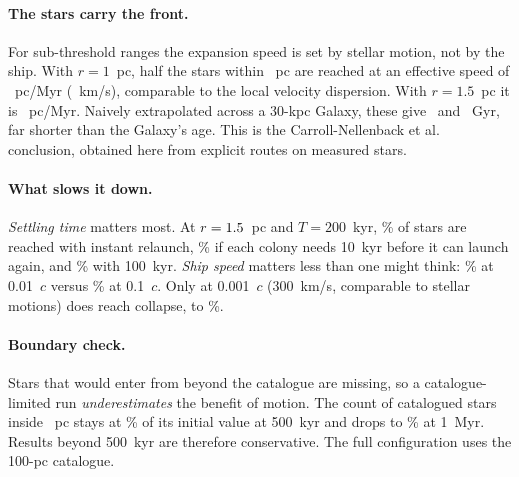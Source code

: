 \paragraph{The stars carry the front.} For sub-threshold ranges the expansion
speed is set by stellar motion, not by the ship. With $r=1$~pc, half the stars
within \TdEval~pc are reached at an effective speed of \FrontOne~pc/Myr
(\FrontOneKms~km/s), comparable to the local velocity dispersion. With
$r=1.5$~pc it is \FrontOneHalf~pc/Myr. Naively extrapolated across a
30-kpc Galaxy, these give \GalaxyCrossGyrOne\ and \GalaxyCrossGyrOneHalf~Gyr,
far shorter than the Galaxy's age. This is the Carroll-Nellenback et al.\
\cite{carroll2019fermi} conclusion, obtained here from explicit routes on
measured stars.

\paragraph{What slows it down.} \emph{Settling time} matters most. At
$r=1.5$~pc and $T=200$~kyr, \SettleZero\% of stars are reached with
instant relaunch, \SettleTen\% if each colony needs 10~kyr before it can
launch again, and \SettleHundred\% with 100~kyr. \emph{Ship speed} matters less
than one might think: \SpeedMid\% at 0.01~$c$ versus \SpeedFast\% at 0.1~$c$.
Only at 0.001~$c$ (300~km/s, comparable to stellar motions) does reach
collapse, to \SpeedSlow\%.

\paragraph{Boundary check.} Stars that would enter from beyond the catalogue
are missing, so a catalogue-limited run \emph{underestimates} the benefit of
motion. The count of catalogued stars inside \TdEval~pc stays at
\RetFiveHundred\% of its initial value at 500~kyr and drops to \RetThousand\% at
1~Myr. Results beyond 500~kyr are therefore conservative. The full
configuration uses the 100-pc catalogue.
